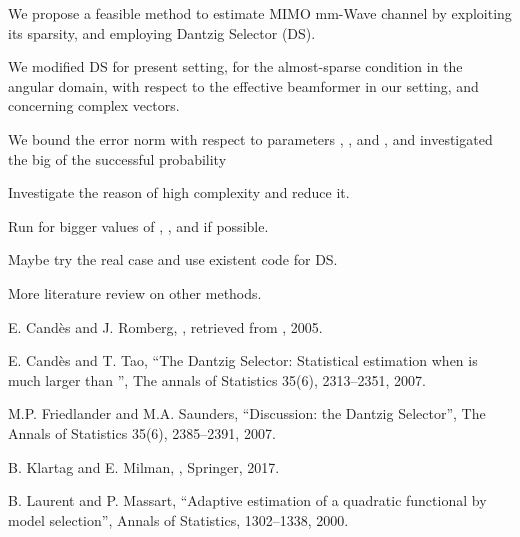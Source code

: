 {
\I We propose a feasible method to estimate MIMO mm-Wave channel  by exploiting its sparsity, and employing Dantzig Selector (DS).

\I We modified DS for present setting, for the almost-sparse condition in the angular domain, with respect to the effective beamformer  in our setting, and concerning complex vectors.

\I We bound the error norm with respect to parameters , , and , and investigated the big  of the successful probability
}
{
\I Investigate the reason of high complexity and reduce it.

\I Run for bigger values of , , and  if possible.

\I Maybe try the real case and use existent code for DS.

\I More literature review on other methods.
}
{
{\tfx
\I E. Candès and J. Romberg, , retrieved from , 2005.

\I E. Candès and T. Tao, ``The Dantzig Selector: Statistical estimation when  is much larger than '', The annals of Statistics 35(6), 2313–2351, 2007.

\I M.P. Friedlander and M.A. Saunders, ``Discussion: the Dantzig Selector'', The Annals of Statistics 35(6), 2385–2391, 2007.

\I B. Klartag and E. Milman, , Springer, 2017.

\I B. Laurent and P. Massart, ``Adaptive estimation of a quadratic functional by model selection'', Annals of Statistics, 1302–1338, 2000.
}
}

